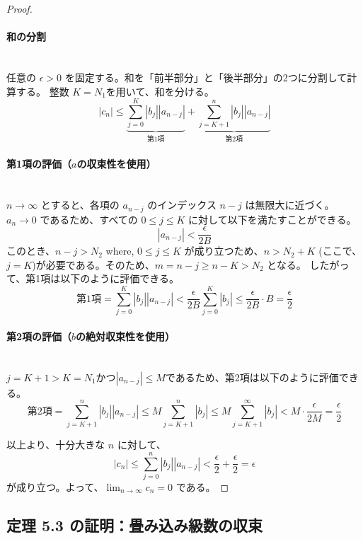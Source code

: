 \documentclass[dvipdfmx,a4paper,11pt]{jsarticle}
\begin{document}
\begin{proof}
\begin{enumerate}
\end{enumerate}

\paragraph{和の分割}\ \\
\noindent
任意の $\epsilon > 0$ を固定する。和を「前半部分」と「後半部分」の2つに分割して計算する。
整数 $K=N_1$を用いて、和を分ける。
\[
|c_n| \le \underbrace{\sum_{j=0}^{K} |b_j| |a_{n-j}|}_{\text{第1項}} + \underbrace{\sum_{j=K+1}^{n} |b_j| |a_{n-j}|}_{\text{第2項}}
\]

\paragraph{第1項の評価（$a$の収束性を使用）}\ \\
\noindent
$n \to \infty$ とすると、各項の $a_{n-j}$ のインデックス $n-j$ は無限大に近づく。
$a_n \to 0$ であるため、すべての $0 \le j \le K$ に対して以下を満たすことができる。
\[
|a_{n-j}| < \frac{\epsilon}{2B}
\]
このとき、$n-j>N_2$ where, $0 \le j \le K$ が成り立つため、$n > N_2 + K$ (ここで、$j = K$)が必要である。そのため、$m = n-j \geq n-K > N_2$ となる。
したがって、第1項は以下のように評価できる。
\[
\text{第1項} = \sum_{j=0}^{K} |b_j| |a_{n-j}| < \frac{\epsilon}{2B} \sum_{j=0}^{K} |b_j| \le \frac{\epsilon}{2B} \cdot B = \frac{\epsilon}{2}
\]

\paragraph{第2項の評価（$b$の絶対収束性を使用）}\ \\
\noindent
$j=K+1 > K=N_1$かつ$\left|a_{n-j}\right| \leq M$であるため、第2項は以下のように評価できる。
\[
\text{第2項} = \sum_{j=K+1}^{n} |b_j| |a_{n-j}| \leq M \sum_{j=K+1}^{n} |b_j| \le M \sum_{j=K+1}^{\infty} |b_j| < M \cdot \frac{\epsilon}{2M} = \frac{\epsilon}{2}
\]

\noindent
以上より、十分大きな $n$ に対して、
\[
|c_n| \le \sum_{j=0}^{n} |b_j| |a_{n-j}| < \frac{\epsilon}{2} + \frac{\epsilon}{2} = \epsilon
\]
が成り立つ。よって、$\displaystyle\lim_{n \to \infty} c_n = 0$ である。
\end{proof}
\newpage
\subsection{定理 5.3 の証明：畳み込み級数の収束}\label{app:5.3}
\end{document}
